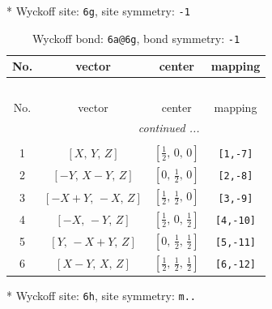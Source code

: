 \documentclass[fleqn,8pt]{jsarticle}
\begin{document}
* Wyckoff site: {\tt 6g}, site symmetry: {\tt -1}
\renewcommand{\arraystretch}{1.2}
\begin{longtable}{cccc}
\caption{Wyckoff bond: {\tt 6a@6g}, bond symmetry: {\tt -1}}
 \\
 \hline \hline
No. & vector & center & mapping \\ \hline \endfirsthead

\multicolumn{3}{l}{\tablename\ \thetable{}} \\
 \hline \hline
No. & vector & center & mapping \\ \hline \endhead

 \hline \hline
\multicolumn{3}{r}{\footnotesize\it continued ...} \\ \endfoot

 \hline \hline
\multicolumn{3}{r}{} \\ \endlastfoot

1 & $\left[ X,\, Y,\, Z \right]$ & $\left[ \frac{1}{2},\, 0,\, 0 \right]$ & {\tt [1,-7]} \\ \hline
2 & $\left[ - Y,\, X - Y,\, Z \right]$ & $\left[ 0,\, \frac{1}{2},\, 0 \right]$ & {\tt [2,-8]} \\ \hline
3 & $\left[ - X + Y,\, - X,\, Z \right]$ & $\left[ \frac{1}{2},\, \frac{1}{2},\, 0 \right]$ & {\tt [3,-9]} \\ \hline
4 & $\left[ - X,\, - Y,\, Z \right]$ & $\left[ \frac{1}{2},\, 0,\, \frac{1}{2} \right]$ & {\tt [4,-10]} \\ \hline
5 & $\left[ Y,\, - X + Y,\, Z \right]$ & $\left[ 0,\, \frac{1}{2},\, \frac{1}{2} \right]$ & {\tt [5,-11]} \\ \hline
6 & $\left[ X - Y,\, X,\, Z \right]$ & $\left[ \frac{1}{2},\, \frac{1}{2},\, \frac{1}{2} \right]$ & {\tt [6,-12]} \\
\end{longtable}
* Wyckoff site: {\tt 6h}, site symmetry: {\tt m..}
\renewcommand{\arraystretch}{1.2}
\end{document}

